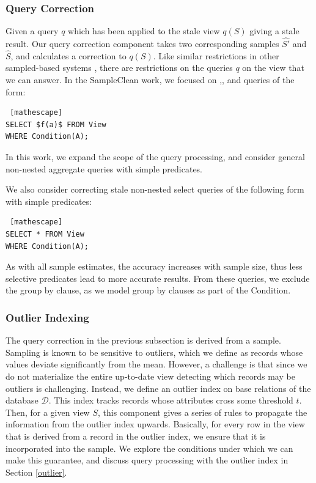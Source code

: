 \subsubsection{Query Correction}
Given a query $q$ which has been applied to the stale view $q(S)$ giving a stale result.
Our query correction component takes two corresponding samples $\hat{S'}$ and $\hat{S}$, and calculates a correction to $q(S)$.
Like similar restrictions in other sampled-based systems \cite{agarwalknowing}, there are restrictions on the queries $q$ on the view that we can answer. 
In the SampleClean work, we focused on \sumfunc,\countfunc, and \avgfunc queries of the form: 
\begin{lstlisting} [mathescape]
SELECT $f(a)$ FROM View 
WHERE Condition(A);
\end{lstlisting}
In this work, we expand the scope of the query processing, and consider general non-nested aggregate queries with simple predicates.

We also consider correcting stale non-nested select queries of the following form with simple predicates:
\begin{lstlisting} [mathescape]
SELECT * FROM View 
WHERE Condition(A);
\end{lstlisting}
As with all sample estimates, the accuracy increases with sample size, thus less selective predicates lead to more accurate results.
From these queries, we exclude the group by clause, as we model group by clauses as part of the \textsf{Condition}.

\subsubsection{Outlier Indexing}
The query correction in the previous subsection is derived from a sample.
Sampling is known to be sensitive to outliers, which we define as records whose values deviate significantly from the mean.
However, a challenge is that since we do not materialize the entire up-to-date view detecting which records may be outliers is challenging.
Instead, we define an outlier index on base relations of the database $\mathcal{D}$.
This index tracks records whose attributes cross some threshold $t$.
Then, for a given view $S$, this component gives a series of rules to propagate the information from the outlier index upwards.
Basically, for every row in the view that is derived from a record in the outlier index, we ensure that it is incorporated into the sample.
We explore the conditions under which we can make this guarantee, and discuss query processing with the outlier index in Section \ref{outlier}.

